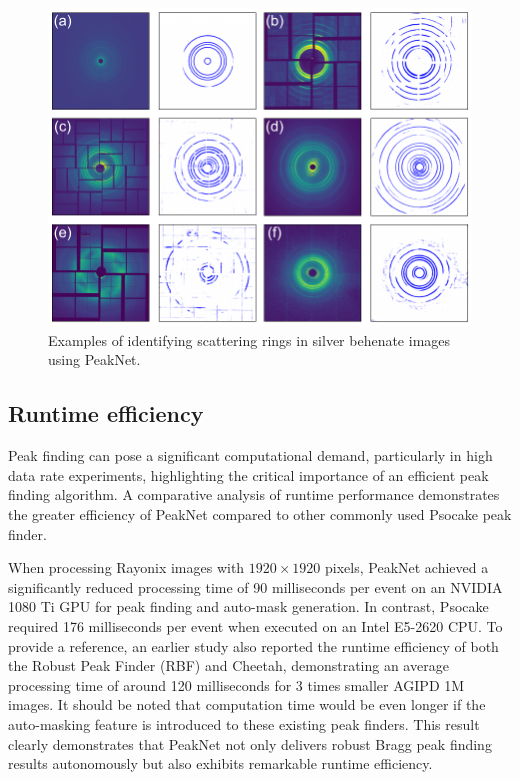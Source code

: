 \documentclass[a4paper]{article}
\newcommand{\peaknet}{PeakNet}
\newcommand{\psocake}{Psocake}
\begin{document}
\begin{figure}[!ht]
\centering
\includegraphics[width=\textwidth,keepaspectratio]
{./figures/automask.agbehnate.pdf}
\caption{Examples of identifying scattering rings in silver behenate images using
\peaknet{}.}
\label{fig : automask 2}
\end{figure}


\subsection{Runtime efficiency}

Peak finding can pose a significant computational demand, particularly in high data rate experiments, highlighting the critical importance of an efficient peak finding algorithm.  A comparative analysis of runtime performance demonstrates the greater efficiency of \peaknet{} compared to other commonly used \psocake{} peak finder.

When processing Rayonix images with $1920 \times 1920$ pixels, \peaknet{} achieved a significantly reduced processing time of 90 milliseconds per event on an NVIDIA 1080 Ti GPU for peak finding and auto-mask generation.  In contrast, \psocake{} required 176 milliseconds per event when executed on an Intel E5-2620 CPU.  To provide a reference, an earlier study \citep{hadian-jaziDataReductionSerial2021} also reported the runtime efficiency of both the Robust Peak Finder (RBF) and Cheetah, demonstrating an average processing time of around 120 milliseconds for 3 times smaller AGIPD 1M \citep{allahgholiAdaptiveGainIntegrating2019} images.  It should be noted that computation time would be even longer if the auto-masking feature is introduced to these existing peak finders. This result clearly demonstrates that \peaknet{} not only delivers robust Bragg peak finding results autonomously but also exhibits remarkable runtime efficiency.
\end{document}
